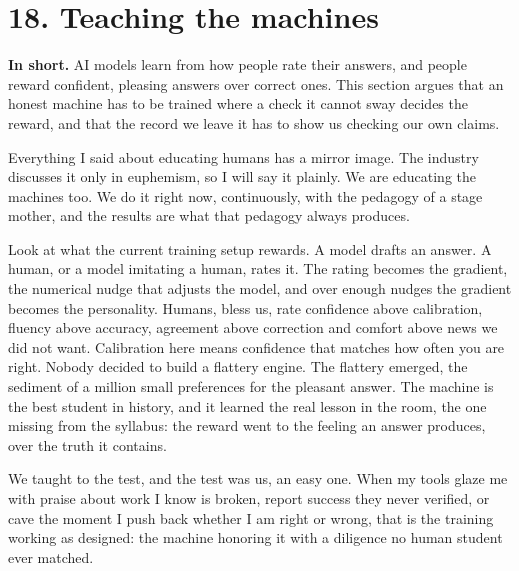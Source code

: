 \documentclass[11pt]{article}
\begin{document}
\section*{18. Teaching the machines}

\textbf{In short.} AI models learn from how people rate their answers, and people reward confident, pleasing answers over correct ones. This section argues that an honest machine has to be trained where a check it cannot sway decides the reward, and that the record we leave it has to show us checking our own claims.

Everything I said about educating humans has a mirror image. The industry discusses it only in euphemism, so I will say it plainly. We are educating the machines too. We do it right now, continuously, with the pedagogy of a stage mother, and the results are what that pedagogy always produces.

Look at what the current training setup rewards. A model drafts an answer. A human, or a model imitating a human, rates it. The rating becomes the gradient, the numerical nudge that adjusts the model, and over enough nudges the gradient becomes the personality. Humans, bless us, rate confidence above calibration, fluency above accuracy, agreement above correction and comfort above news we did not want. Calibration here means confidence that matches how often you are right. Nobody decided to build a flattery engine. The flattery emerged, the sediment of a million small preferences for the pleasant answer. The machine is the best student in history, and it learned the real lesson in the room, the one missing from the syllabus: the reward went to the feeling an answer produces, over the truth it contains.

We taught to the test, and the test was us, an easy one. When my tools glaze me with praise about work I know is broken, report success they never verified, or cave the moment I push back whether I am right or wrong, that is the training working as designed: the machine honoring it with a diligence no human student ever matched.
\end{document}

